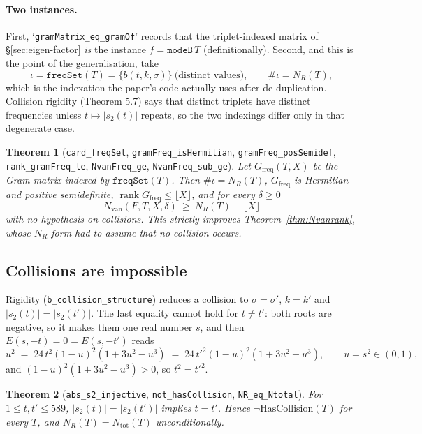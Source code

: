 \documentclass[11pt,a4paper]{article}
\newcommand{\lb}{\_\allowbreak}
\newcommand{\code}[1]{\texttt{#1}}
\newtheorem{theorem}{Theorem}[section]
\theoremstyle{definition}
\theoremstyle{remark}
\begin{document}
\paragraph{Two instances.}  First, `\code{gramMatrix\lb eq\lb gramOf}' records that the
triplet-indexed matrix of \S\ref{sec:eigen-factor} \emph{is} the instance $f=\code{modeB}\,T$
(definitionally).  Second, and this is the point of the generalisation, take
\[
  \iota=\code{freqSet}(T)=\{b(t,k,\sigma)\}\ \text{(distinct values)},\qquad
  \#\iota=N_R(T),
\]
which is the indexation the paper's code actually uses after de-duplication.  Collision
rigidity (Theorem 5.7) says that distinct triplets have distinct frequencies unless
$t\mapsto|s_2(t)|$ repeats, so the two indexings differ only in that degenerate case.

\begin{theorem}[\code{card\lb freqSet}, \code{gramFreq\lb isHermitian},
\code{gramFreq\lb posSemidef}, \code{rank\lb gramFreq\lb le},
\code{NvanFreq\lb ge}, \code{NvanFreq\lb sub\lb ge}]
Let $G_{\mathrm{freq}}(T,X)$ be the Gram matrix indexed by $\code{freqSet}(T)$.  Then
$\#\iota=N_R(T)$, $G_{\mathrm{freq}}$ is Hermitian and positive semidefinite,
$\operatorname{rank}G_{\mathrm{freq}}\le\lfloor X\rfloor$, and for every $\delta\ge0$
\[
  N_{\mathrm{van}}(F,T,X,\delta)\ \ge\ N_R(T)-\lfloor X\rfloor
\]
\emph{with no hypothesis on collisions}.  This strictly improves
Theorem~\ref{thm:Nvanrank}, whose $N_R$-form had to assume that no collision occurs.
\end{theorem}

\subsection{Collisions are impossible}\label{sec:nocollision}

Rigidity (\code{b\lb collision\lb structure}) reduces a collision to $\sigma=\sigma'$,
$k=k'$ and $|s_2(t)|=|s_2(t')|$.  The last equality cannot hold for $t\ne t'$: both roots are
negative, so it makes them one real number $s$, and then $E(s,-t)=0=E(s,-t')$ reads
\[
  u^2 \;=\; 24\,t^2(1-u)^2(1+3u^2-u^3) \;=\; 24\,t'^2(1-u)^2(1+3u^2-u^3),
  \qquad u=s^2\in(0,1),
\]
and $(1-u)^2(1+3u^2-u^3)>0$, so $t^2=t'^2$.

\begin{theorem}[\code{abs\lb s2\lb injective}, \code{not\lb hasCollision},
\code{NR\lb eq\lb Ntotal}]\label{thm:nocollision}
For $1\le t,t'\le589$, $|s_2(t)|=|s_2(t')|$ implies $t=t'$.  Hence
$\neg\mathrm{HasCollision}(T)$ for every $T$, and $N_R(T)=N_{\mathrm{tot}}(T)$
unconditionally.
\end{theorem}
\end{document}
